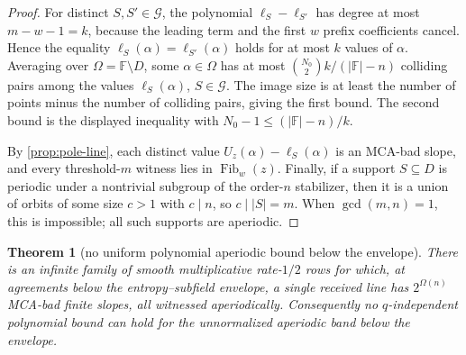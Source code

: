 \documentclass[a4paper,11pt]{amsart}
\newtheorem{theorem}{Theorem}[section]
\theoremstyle{remark}
\newcommand{\F}{\mathbb F}
\newcommand{\Fib}{\operatorname{Fib}}
\begin{document}
\begin{proof}
For distinct \(S,S'\in\mathcal G\), the polynomial \(\ell_S-\ell_{S'}\) has degree at most \(m-w-1=k\), because the leading term and the first \(w\) prefix coefficients cancel.  Hence the equality \(\ell_S(\alpha)=\ell_{S'}(\alpha)\) holds for at most \(k\) values of \(\alpha\).  Averaging over \(\Omega=\F\setminus D\), some \(\alpha\in\Omega\) has at most \(\binom{N_0}{2}k/(|\F|-n)\) colliding pairs among the values \(\ell_S(\alpha)\), \(S\in\mathcal G\).  The image size is at least the number of points minus the number of colliding pairs, giving the first bound.  The second bound is the displayed inequality with \(N_0-1\le (|\F|-n)/k\).

By \cref{prop:pole-line}, each distinct value \(U_z(\alpha)-\ell_S(\alpha)\) is an MCA-bad slope, and every threshold-\(m\) witness lies in \(\Fib_w(z)\).  Finally, if a support \(S\subseteq D\) is periodic under a nontrivial subgroup of the order-\(n\) stabilizer, then it is a union of orbits of some size \(c>1\) with \(c\mid n\), so \(c\mid |S|=m\).  When \(\gcd(m,n)=1\), this is impossible; all such supports are aperiodic.
\end{proof}

\begin{theorem}[no uniform polynomial aperiodic bound below the envelope]\label{thm:no-old-band}
There is an infinite family of smooth multiplicative rate-\(1/2\) rows for which, at agreements below the entropy--subfield envelope, a single received line has \(2^{\Omega(n)}\) MCA-bad finite slopes, all witnessed aperiodically.  Consequently no \(q\)-independent polynomial bound can hold for the unnormalized aperiodic band below the envelope.
\end{theorem}
\end{document}
